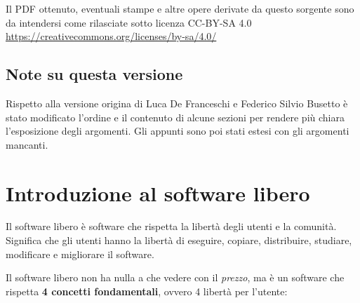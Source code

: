 \noindent Il PDF ottenuto, eventuali stampe e altre opere derivate da questo sorgente sono da intendersi come rilasciate sotto licenza CC-BY-SA 4.0 \\
\url{https://creativecommons.org/licenses/by-sa/4.0/}

\subsection{Note su questa versione}

Rispetto alla versione origina di Luca De Franceschi e Federico Silvio Busetto è stato modificato l'ordine e il contenuto di alcune sezioni per rendere più chiara l'esposizione degli argomenti.
Gli appunti sono poi stati estesi con gli argomenti mancanti.

\section{Introduzione al software libero}

Il software libero è software che rispetta la libertà degli utenti e la comunità. Significa che gli utenti hanno la libertà di eseguire, copiare, distribuire, studiare, modificare e migliorare il software.

Il software libero non ha nulla a che vedere con il \textit{prezzo}, ma è un software che rispetta \textbf{4 concetti fondamentali}, ovvero 4 libertà per l'utente:

